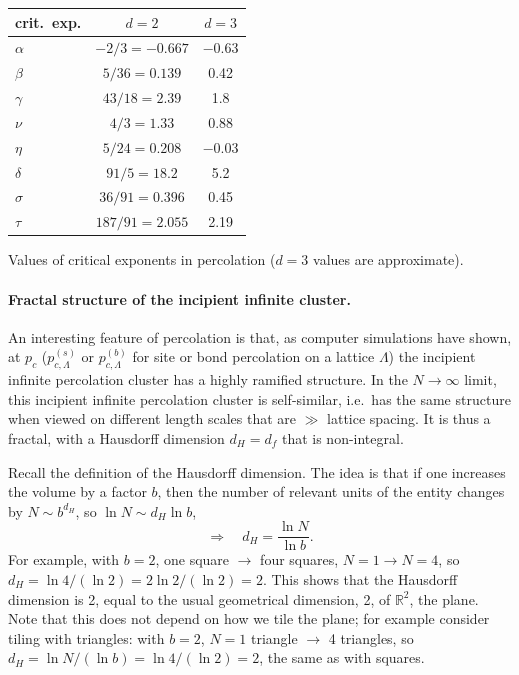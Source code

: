 \begin{center}
\renewcommand{\arraystretch}{1.25}
\begin{tabular}{lcc}
  crit.\ exp. & $d = 2$ & $d = 3$\\ \hline
  $\alpha$ & $-2/3 = -0.667$ & $-0.63$\\
  $\beta$ & $5/36 = 0.139$ & 0.42\\
  $\gamma$ & $43/18 = 2.39$ & 1.8\\
  $\nu$ & $4/3 = 1.33$ & 0.88\\
  $\eta$ & $5/24 = 0.208$ & $-0.03$\\
  $\delta$ & $91/5 = 18.2$ & 5.2\\
  $\sigma$ & $36/91 = 0.396$ & 0.45\\
  $\tau$ & $187/91 = 2.055$ & 2.19
\end{tabular}

\smallskip
{\small Values of critical exponents in percolation ($d = 3$ values are approximate).}
\end{center}

\paragraph{Fractal structure of the incipient infinite cluster.}

An interesting feature of percolation is that, as computer simulations have shown, at $p_c$ ($p_{c,\Lambda}^{(s)}$ or
$p_{c,\Lambda}^{(b)}$ for site or bond percolation on a lattice $\Lambda$) the incipient infinite percolation cluster has a
highly ramified structure. In the $N\to\infty$ limit, this incipient infinite percolation cluster is self-similar, i.e.\ has
the same structure when viewed on different length scales that are $\gg$ lattice spacing. It is thus a fractal, with a
Hausdorff dimension $d_H = d_f$ that is non-integral.

Recall the definition of the Hausdorff dimension. The idea is that if one increases the volume by a factor $b$, then the
number of relevant units of the entity changes by $N\sim b^{d_H}$, so $\ln N\sim d_H\ln b$,
\begin{equation}
  \Rightarrow\quad d_H = \frac{\ln N}{\ln b}.
\end{equation}
For example, with $b = 2$, one square $\to$ four squares, $N = 1\to N = 4$, so $d_H = \ln 4/(\ln 2) = 2\ln 2/(\ln 2) = 2$.
This shows that the Hausdorff dimension is 2, equal to the usual geometrical dimension, 2, of $\mathbb R^2$, the plane. Note
that this does not depend on how we tile the plane; for example consider tiling with triangles: with $b = 2$, $N = 1$ triangle
$\to$ 4 triangles, so $d_H = \ln N/(\ln b) = \ln 4/(\ln 2) = 2$, the same as with squares.

